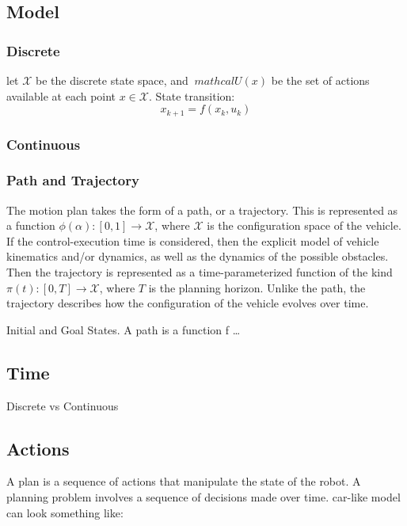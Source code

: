 \subsection{Model}

\subsubsection{Discrete}
let \(\mathcal{X}\) be the discrete state space, and \(\ mathcal{U}(x)\) be the
set of actions available at each point \(x \in \mathcal{X}\). State transition:\
\[
  x_{k+1} = f(x_k, u_k)
\]

\subsubsection{Continuous}

\subsubsection{Path and Trajectory}

The motion plan takes the form of a path, or a trajectory. This is represented
as a function \(\phi(\alpha) \colon [0,1] \rightarrow \mathcal{X}\), where
\(\mathcal{X}\) is the configuration space of the vehicle. If the
control-execution time is considered, then the explicit model of vehicle
kinematics and/or dynamics, as well as the dynamics of the possible obstacles.
Then the trajectory is represented as a time-parameterized function of the kind
\(\pi(t) \colon [0,T] \rightarrow \mathcal{X}\), where \(T\) is the planning
horizon. Unlike the path, the trajectory describes how the configuration of the
vehicle evolves over time.

Initial and Goal States. A path is a function f \ldots

\subsection{Time}

Discrete vs Continuous

\subsection{Actions}

A plan is a sequence of actions that manipulate the state of the robot. A
planning problem involves a sequence of decisions made over time. car-like model
can look something like:

